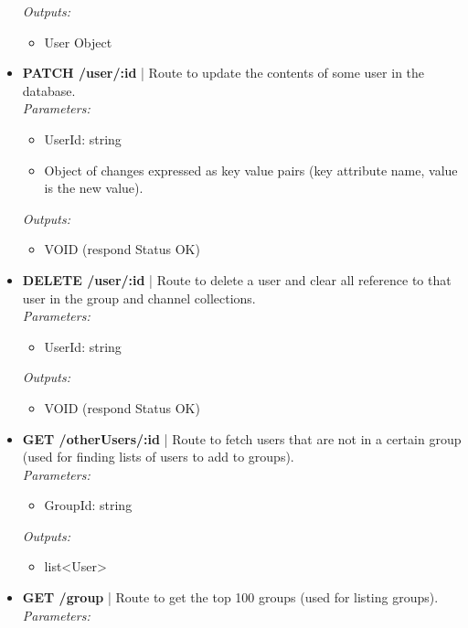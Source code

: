 \documentclass[11pt, conference,letterpaper]{IEEEtran}
\begin{document}
\begin{itemize}
        \textit{Outputs: }
        \begin{itemize}
            \item User Object
        \end{itemize}
    \item \textbf{PATCH /user/:id} | Route to update the contents of some user in the database.
        \\ \textit{Parameters: }
        \begin{itemize}
            \item UserId: string
            \item Object of changes expressed as key value pairs (key attribute name, value is the new value).
        \end{itemize}
        \textit{Outputs: }
        \begin{itemize}
            \item VOID (respond Status OK)
        \end{itemize}
    \item \textbf{DELETE /user/:id} | Route to delete a user and clear all reference to that user in the group and channel collections.
        \\ \textit{Parameters: }
        \begin{itemize}
            \item UserId: string
        \end{itemize}
        \textit{Outputs: }
        \begin{itemize}
            \item VOID (respond Status OK)
        \end{itemize}
    \item \textbf{GET /otherUsers/:id} | Route to fetch users that are not in a certain group (used for finding lists of users to add to groups).
        \\ \textit{Parameters: }
        \begin{itemize}
            \item GroupId: string
        \end{itemize}
        \textit{Outputs: }
        \begin{itemize}
            \item list<User>
        \end{itemize}
    \item \textbf{GET /group} | Route to get the top 100 groups (used for listing groups).
        \\ \textit{Parameters: }
        \begin{itemize}

\end{itemize}
\end{itemize}
\end{document}

